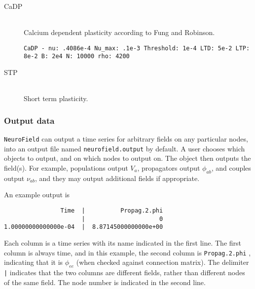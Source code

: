 \documentclass[12pt,a4paper]{article}
\newcommand{\type}[1]{ {\small\small\tt #1} }
\begin{document}
\begin{itemize}
\begin{description}
	\item[CaDP]\ \\
	Calcium dependent plasticity according to Fung and Robinson.
	\begin{lstlisting}
CaDP - nu: .4086e-4 Nu_max: .1e-3 Threshold: 1e-4 LTD: 5e-2 LTP: 8e-2 B: 2e4 N: 10000 rho: 4200
	\end{lstlisting}

	\item[STP]\ \\
	Short term plasticity.

\end{description}
\end{itemize}

\subsubsection{Output data}
\label{sec:output}

\type{NeuroField} can output a time series for arbitrary fields on any particular nodes, into an output file named \type{neurofield.output} by default. A user chooses which objects to output, and on which nodes to output on. The object then outputs the field(s). For example, populations output $V_a$, propagators output $\phi_{ab}$, and couples output $\nu_{ab}$, and they may output additional fields if appropriate.

An example output is
\begin{lstlisting}
                Time  |          Propag.2.phi
                      |                     0
1.00000000000000e-04  |  8.87145000000000e+00
\end{lstlisting}

Each column is a time series with its name indicated in the first line. The first column is always time, and in this example, the second column is \type{Propag.2.phi}, indicating that it is $\phi_{ee}$ (when checked against connection matrix). The delimiter \type{|} indicates that the two columns are different fields, rather than different nodes of the same field. The node number is indicated in the second line.
\end{document}
